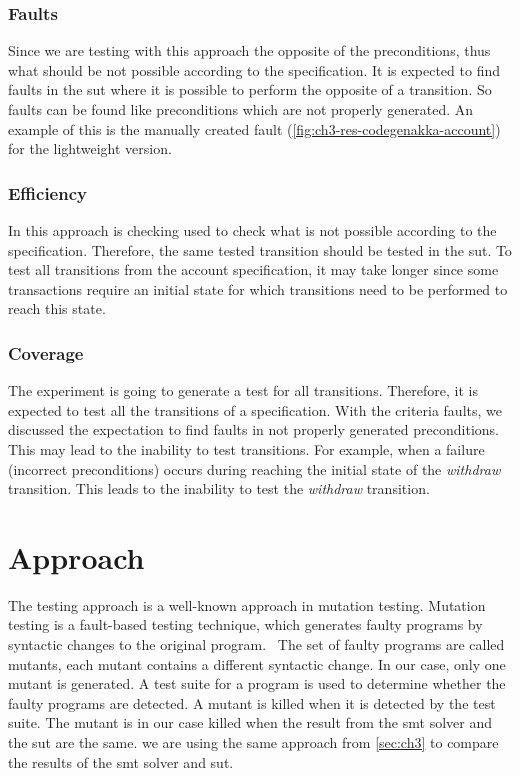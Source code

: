 \subsubsection{Faults}
Since we are testing with this approach the opposite of the preconditions, thus
what should be not possible according to the specification. It is expected to
find faults in the \gls{sut} where it is possible to perform the opposite of a
transition. So faults can be found like preconditions which are not properly
generated. An example of this is the manually created fault
(\autoref{fig:ch3-res-codegenakka-account}) for the lightweight version.

\subsubsection{Efficiency}
In this approach is checking used to check what is not possible according to the
specification. Therefore, the same tested transition should be tested in the
\gls{sut}. To test all transitions from the account specification, it may take
longer since some transactions require an initial state for which transitions
need to be performed to reach this state.

\subsubsection{Coverage}
The experiment is going to generate a test for all transitions. Therefore,
it is expected to test all the transitions of a specification. With the criteria
faults, we discussed the expectation to find faults in not properly generated
preconditions. This may lead to the inability to test transitions. For example,
when a failure (incorrect preconditions) occurs during reaching the initial
state of the \textit{withdraw} transition. This leads to the inability to test
the \textit{withdraw} transition.

\section{Approach}
The testing approach is a well-known approach in mutation testing. Mutation testing is
a fault-based testing technique, which generates faulty programs by syntactic
changes to the original program.~\cite[p.~1]{jia2011analysis} The set of faulty
programs are called mutants, each mutant contains a different syntactic change.
In our case, only one mutant is generated. A test suite for a program is used to
determine whether the faulty programs are detected. A mutant is killed when it
is detected by the test suite. The mutant is in our case killed when the result
from the \gls{smt} solver and the \gls{sut} are the same. we are using the same
approach from \autoref{sec:ch3} to compare the results of the \gls{smt} solver and
\gls{sut}.

